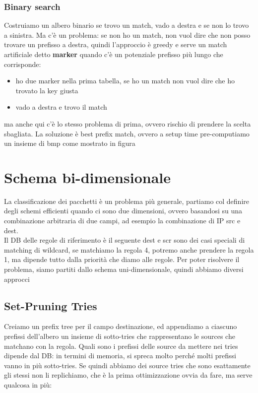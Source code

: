 \documentclass[12pt, oneside]{extbook} %
\begin{document}
\subsubsection{Binary search}
Costruiamo un albero binario
se trovo un match, vado a destra e se non lo trovo a sinistra. Ma c'è un problema: se non ho un match, non vuol dire che non posso trovare un prefisso a destra, quindi l'approccio è greedy e serve un match artificiale detto \textbf{marker} quando c'è un potenziale prefisso più lungo che corrisponde:
\begin{itemize}
\item ho due marker nella prima tabella, se ho un match non vuol dire che ho trovato la key giusta
\item vado a destra e trovo il match
\end{itemize}
ma anche qui c'è lo stesso problema di prima, ovvero rischio di prendere la scelta sbagliata. La soluzione è best prefix match, ovvero a setup time pre-computiamo un insieme di bmp come mostrato in figura
\section{Schema bi-dimensionale}
La classificazione dei pacchetti è un problema più generale, partiamo col definire degli schemi efficienti quando ci sono due dimensioni, ovvero basandosi su una combinazione arbitraria di due campi, ad esempio la combinazione di IP src e dest.\\ Il DB delle regole di riferimento è il seguente
dest e scr sono dei casi speciali di matching di wildcard, se matchiamo la regola 4, potremo anche prendere la regola 1, ma dipende tutto dalla priorità che diamo alle regole. Per poter risolvere il problema, siamo partiti dallo schema uni-dimensionale, quindi abbiamo diversi approcci
\subsection{Set-Pruning Tries}
Creiamo un prefix tree per il campo destinazione, ed appendiamo a ciascuno prefissi dell'albero un insieme di sotto-tries che rappresentano le sources che matchano con la regola. Quali sono i prefissi delle source da mettere nei tries dipende dal DB:
in termini di memoria, si spreca molto perché molti prefissi vanno in più sotto-tries. Se quindi abbiamo dei source tries che sono esattamente gli stessi non li replichiamo, che è la prima ottimizzazione ovvia da fare, ma serve qualcosa in più: 
\end{document}
